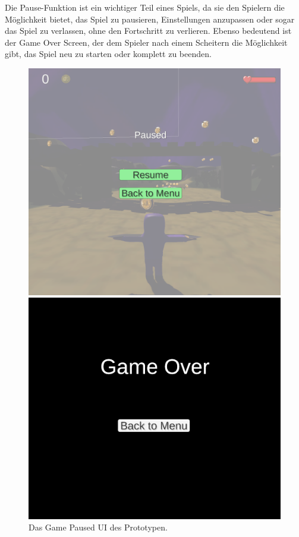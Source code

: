 Die Pause-Funktion ist ein wichtiger Teil eines Spiels, da sie den Spielern die Möglichkeit bietet, das Spiel zu pausieren, Einstellungen anzupassen oder sogar das Spiel zu verlassen, ohne den Fortschritt zu verlieren. Ebenso bedeutend ist der Game Over Screen, der dem Spieler nach einem Scheitern die Möglichkeit gibt, das Spiel neu zu starten oder komplett zu beenden.

\begin{figure}[H]
    \centering
    \begin{minipage}{0.38\textwidth}
        \centering
        \includegraphics[width=\linewidth]{chapters/03/images/GamePaused.png}
        \caption{Das Game Paused UI des Prototypen.}
        \label{UI01}
    \end{minipage}
    \hspace{1cm}
    \begin{minipage}{0.4\textwidth}
        \centering
        \includegraphics[width=\linewidth]{chapters/03/images/GameOver.png}

\end{minipage}
\end{figure}
